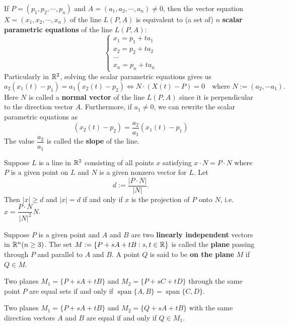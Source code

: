 \documentclass[a4paper]{ctexart}
\begin{document}
    \begin{myrmk}
        If $P=(p_1,p_2,\cdots,p_n)$ and $A = (a_1,a_2,\cdots,a_n)\ne 0$, then the vector equation $X=(x_1,x_2,\cdots,x_n)$ of the line $L(P,A)$ is equivalent to (a set of) $n$ \textbf{scalar parametric equations} of the line $L(P,A)$:
        \[
        \begin{cases}
            x_1 = p_1 + t a_1 \\
            x_2 = p_2 + t a_2 \\
            \cdots \\
            x_n = p_n + t a_n
        \end{cases}
        \]
        Particularly in $\mathbb{R}^2$, solving the scalar parametric equations gives us
        \[
        a_2 (x_1(t) - p_1) = a_1 (x_2(t) - p_2) \Leftrightarrow N \cdot (X(t) - P) = 0 \quad \text{where } N := (a_2,-a_1).
        \]
        Here $N$ is called a \textbf{normal vector} of the line $L(P,A)$ since it is perpendicular to the direction vector $A$. Furthermore, if $a_1 \ne 0$, we can rewrite the scalar parametric equations as
        \[
        (x_2(t) - p_2) = \frac{a_2}{a_1} (x_1(t) - p_1) 
        \]
        The value $\dfrac{a_2}{a_1}$ is called the \textbf{slope} of the line.
    \end{myrmk}
    \begin{mythm}
        Suppose $L$ is a line in $\mathbb{R}^2$ consisting of all points $x$ satisfying $x \cdot N = P \cdot N$ where $P$ is a given point on $L$ and $N$ is a given nonzero vector for $L$. Let
        $$ d:= \frac{|P\cdot N|}{|N|}.$$
        Then $|x| \ge d$ and $|x| = d$ if and only if $x$ is the projection of $P$ onto $N$, i.e. $x = \dfrac{P\cdot N}{|N|^2} N$.
    \end{mythm}
    \begin{mydef}
        Suppose $P$ is a given point and $A$ and $B$ are two \textbf{linearly independent} vectors in $\mathbb{R}^n(n\ge 3)$. The set $M:=\{ P + sA + tB : s,t\in \mathbb{R}\}$ is called the \textbf{plane} passing through $P$ and parallel to $A$ and $B$. A point $Q$ is said to be \textbf{on the plane} $M$ if $Q\in M$.
    \end{mydef}
    \begin{mythm}
        Two planes $M_1 = \{ P + sA + tB\} $ and $M_2 = \{ P + sC + tD\}$ through the same point $P$ are equal sets if and only if $\operatorname{span} \{A,B\} = \operatorname{span} \{C,D\}$.
    \end{mythm}
    \begin{mythm}
        Two planes $M_1 = \{ P + sA + tB\}$ and $M_2 = \{ Q + sA + tB\}$ with the same direction vectors $A$ and $B$ are equal if and only if $Q\in M_1$.
    \end{mythm}
\end{document}
